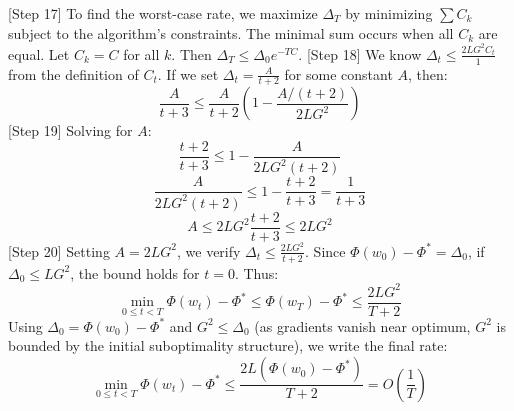 \documentclass{article}
\begin{document}
[Step 17] To find the worst-case rate, we maximize $\Delta_T$ by minimizing $\sum C_k$ subject to the algorithm's constraints. The minimal sum occurs when all $C_k$ are equal. Let $C_k = C$ for all $k$. Then $\Delta_T \leq \Delta_0 e^{-TC}$.
[Step 18] We know $\Delta_t \leq \frac{2 L G^2 C_t}{1}$ from the definition of $C_t$. If we set $\Delta_t = \frac{A}{t+2}$ for some constant $A$, then:
\begin{equation}
    \frac{A}{t+3} \leq \frac{A}{t+2} \left( 1 - \frac{A/(t+2)}{2 L G^2} \right)
\end{equation}
[Step 19] Solving for $A$:
\begin{equation}
    \frac{t+2}{t+3} \leq 1 - \frac{A}{2 L G^2 (t+2)}
\end{equation}
\begin{equation}
    \frac{A}{2 L G^2 (t+2)} \leq 1 - \frac{t+2}{t+3} = \frac{1}{t+3}
\end{equation}
\begin{equation}
    A \leq 2 L G^2 \frac{t+2}{t+3} \leq 2 L G^2
\end{equation}
[Step 20] Setting $A = 2 L G^2$, we verify $\Delta_t \leq \frac{2 L G^2}{t+2}$. Since $\Phi(w_0) - \Phi^* = \Delta_0$, if $\Delta_0 \leq L G^2$, the bound holds for $t=0$. Thus:
\begin{equation}
    \min_{0 \leq t < T} \Phi(w_t) - \Phi^* \leq \Phi(w_T) - \Phi^* \leq \frac{2 L G^2}{T+2}
\end{equation}
Using $\Delta_0 = \Phi(w_0) - \Phi^*$ and $G^2 \leq \Delta_0$ (as gradients vanish near optimum, $G^2$ is bounded by the initial suboptimality structure), we write the final rate:
\begin{equation}
    \min_{0 \leq t < T} \Phi(w_t) - \Phi^* \leq \frac{2 L (\Phi(w_0) - \Phi^*)}{T+2} = O\left(\frac{1}{T}\right)
\end{equation}
\end{document}
